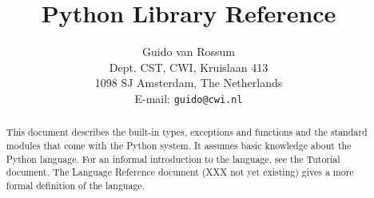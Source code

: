 

\newcommand{\itembreak}{
	\mbox{}\\*[0mm]
}

\newcommand{\funcitem}[2]{\item[#1(#2)]}

\newcommand{\dataitem}[1]{\item[#1]}

\newcommand{\excitem}[2]{
\item[#1 = {\tt '#2'}]
\itembreak
}

\title{\bf
	Python Library Reference
}

\author{
	Guido van Rossum \\
	Dept. CST, CWI, Kruislaan 413 \\
	1098 SJ Amsterdam, The Netherlands \\
	E-mail: {\tt guido@cwi.nl}
}




\maketitle

\begin{abstract}

\noindent
This document describes the built-in types, exceptions and functions and
the standard modules that come with the Python system.
It assumes basic knowledge about the Python language.
For an informal introduction to the language, see the Tutorial document.
The Language Reference document (XXX not yet existing)
gives a more formal definition of the language.

\end{abstract}

\pagebreak

\tableofcontents

\pagebreak







